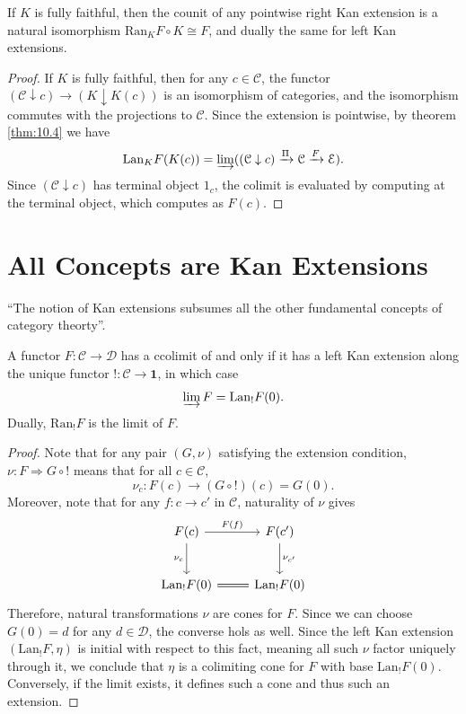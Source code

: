 \begin{corollary}\label{cor:10.2}
	If $K$ is fully faithful, then the counit of any pointwise right Kan extension is a natural isomorphism $\mathrm{Ran} _KF\circ K \cong F$, and dually the same for left Kan extensions.
\end{corollary}
\begin{proof}
	If $K$ is fully faithful, then for any $c\in \mathcal{C} $, the functor $(\mathcal{C} \downarrow c)\to (K\downarrow K(c))$ is an isomorphism of categories, and the isomorphism commutes with the projections to $\mathcal{C} $. Since the extension is pointwise, by theorem \ref{thm:10.4} we have
	\[
		\mathrm{Lan} _KF(K(c))=\varinjlim ((\mathcal{C} \downarrow c)\xrightarrow{\Pi}\mathcal{C} \xrightarrow{F}\mathcal{E} )
	.\]
	Since $(\mathcal{C} \downarrow c)$ has terminal object $1_c$, the colimit is evaluated by computing at the terminal object, which computes as $F(c)$.
\end{proof}

\section{All Concepts are Kan Extensions}

``The notion of Kan extensions subsumes all the other fundamental concepts of category theorty''.

\begin{theorem}[(Co)Limits]\label{thm:10.5}
	A functor $F : \mathcal{C}  \to \mathcal{D} $ has a ccolimit of and only if it has a left Kan extension along the unique functor $!: \mathcal{C}  \to \mathbf{1} $, in which case
	\[
		\varinjlim F=\mathrm{Lan} _!F(0)
	.\]
	Dually, $\mathrm{Ran} _!F$ is the limit of $F$.
\end{theorem}
\begin{proof}
	Note that for any pair $(G,\nu)$ satisfying the extension condition, $\nu : F \Rightarrow G\circ !$ means that for all $c\in \mathcal{C} $,
	\[
		\nu_c : F(c) \to (G\circ !)(c)=G(0)
	.\]
	Moreover, note that for any $f : c \to c'$ in $\mathcal{C} $, naturality of $\nu$ gives
	\[\begin{tikzcd}[row sep = 2.5em, column sep = 2.5em]
	F(c)\ar[" F(f) ", r] \ar[" \nu_c "', d]  & F(c')\ar[" \nu_{c'}  ", d]  \\
	\mathrm{Lan} _!F(0)\ar[equals, r]  & \mathrm{Lan} _!F(0)
	\end{tikzcd}\]
	Therefore, natural transformations $\nu$ are cones for $F$. Since we can choose $G(0)=d$ for any $d\in \mathcal{D} $, the converse hols as well. Since the left Kan extension $(\mathrm{Lan} _!F,\eta)$ is initial with respect to this fact, meaning all such $\nu $ factor uniquely through it, we conclude that $\eta$ is a colimiting cone for $F$ with base $\mathrm{Lan}_!F(0)$. Conversely, if the limit exists, it defines such a cone and thus such an extension.
\end{proof}

